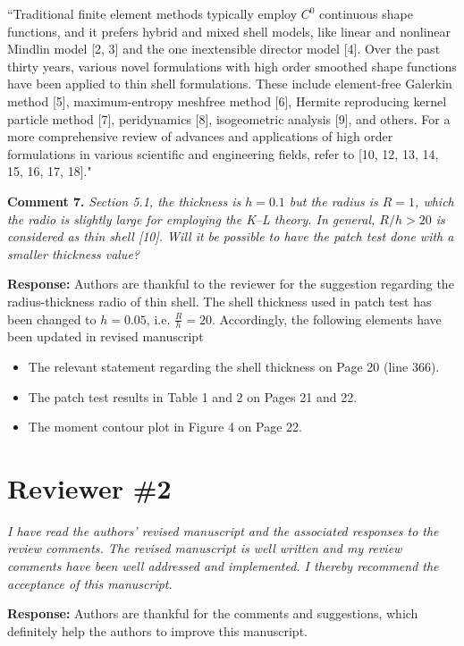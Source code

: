 \documentclass{article}
\begin{document}
``Traditional finite element methods typically employ $C^0$ continuous shape functions, and it prefers hybrid and mixed shell models, like linear and nonlinear Mindlin model [2, 3] and the one inextensible director model [4]. 
Over the past thirty years, various novel formulations with high order smoothed shape functions have been applied to thin shell formulations. These include element-free Galerkin method [5], maximum-entropy meshfree method [6], Hermite reproducing kernel particle method [7], peridynamics [8], isogeometric analysis [9], and others.
For a more comprehensive review of advances and applications of high order formulations in various scientific and engineering fields, refer to [10, 12, 13, 14, 15, 16, 17, 18]."

\textbf{Comment 7.} \textit{Section 5.1, the thickness is $h = 0.1$ but the radius is $R = 1$, which the radio is slightly large for employing the K–L theory. In general, $R/h > 20$ is considered as thin shell [10]. Will it be possible to have the patch test done with a smaller thickness value?}

\textbf{Response:} Authors are thankful to the reviewer for the suggestion regarding the radius-thickness radio of thin shell. The shell thickness used in patch test has been changed to $h=0.05$, i.e. $\frac{R}{h} = 20$. Accordingly, the following elements have been updated in revised manuscript
\begin{itemize}
    \item The relevant statement regarding the shell thickness on Page 20 (line 366). 
    \item The patch test results in Table 1 and 2 on Pages 21 and 22.
    \item The moment contour plot in Figure 4 on Page 22. 
\end{itemize}

\section*{Reviewer \#2}
\textit{I have read the authors' revised manuscript and the associated responses to the review comments. The revised manuscript is well written and my review comments have been well addressed and implemented. I thereby recommend the acceptance of this manuscript.}

\textbf{Response:} Authors are thankful for the comments and suggestions, which definitely help the authors to improve this manuscript.
\end{document}
